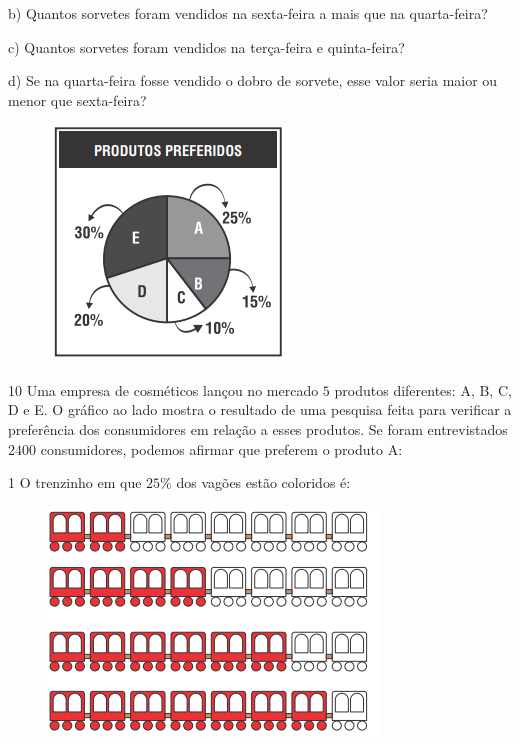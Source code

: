 {b) Quantos sorvetes foram vendidos na sexta-feira a mais que na
quarta-feira? 

c) Quantos sorvetes foram vendidos na terça-feira e quinta-feira? 

d) Se na quarta-feira fosse vendido o dobro de sorvete, esse valor seria
maior ou menor que sexta-feira? 

\begin{figure}
\includegraphics[width=2.51181in,height=2.47708in]{./imgSAEB_6_MAT/media/image88.png}
\end{figure}

\num{10} Uma empresa de cosméticos lançou no mercado $5$ produtos diferentes:
A, B, C, D e E. O gráfico ao lado mostra o resultado de uma pesquisa feita para
verificar a preferência dos consumidores em relação a esses produtos. Se foram entrevistados $2400$ consumidores, podemos afirmar que preferem o
produto A:



\num{1}  O trenzinho em que $25\%$ dos vagões estão coloridos é:

\begin{figure}
\includegraphics[width=3.46528in,height=2.38403in]{./imgSAEB_6_MAT/media/image89.png}
\end{figure}

}
